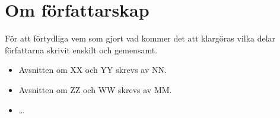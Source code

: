 \tableofcontents

\section*{Om författarskap}
För att förtydliga vem som gjort vad kommer det att klargöras vilka delar
författarna skrivit enskilt och gemensamt.

\begin{itemize}
  \item Avsnitten om XX och YY skrevs av NN.
  \item Avsnitten om ZZ och WW skrevs av MM.
  \item \ldots
\end{itemize}
